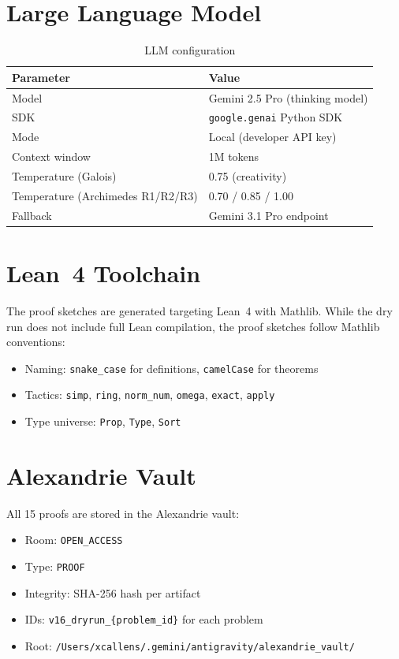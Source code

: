 \documentclass[12pt,a4paper]{report}
\theoremstyle{plain}
\theoremstyle{definition}
\theoremstyle{remark}
\begin{document}
\section{Large Language Model}

\begin{table}[h!]
\centering
\begin{tabular}{ll}
\toprule
\textbf{Parameter} & \textbf{Value} \\
\midrule
Model & Gemini 2.5 Pro (thinking model) \\
SDK & \texttt{google.genai} Python SDK \\
Mode & Local (developer API key) \\
Context window & 1M tokens \\
Temperature (Galois) & 0.75 (creativity) \\
Temperature (Archimedes R1/R2/R3) & 0.70 / 0.85 / 1.00 \\
Fallback & Gemini 3.1 Pro endpoint \\
\bottomrule
\end{tabular}
\caption{LLM configuration}
\end{table}

\section{Lean~4 Toolchain}

The proof sketches are generated targeting Lean~4 with Mathlib. While the dry run
does not include full Lean compilation, the proof sketches follow Mathlib conventions:
\begin{itemize}
  \item Naming: \texttt{snake\_case} for definitions, \texttt{camelCase} for theorems
  \item Tactics: \texttt{simp}, \texttt{ring}, \texttt{norm\_num}, \texttt{omega},
    \texttt{exact}, \texttt{apply}
  \item Type universe: \texttt{Prop}, \texttt{Type}, \texttt{Sort}
\end{itemize}

\section{Alexandrie Vault}

All 15 proofs are stored in the Alexandrie vault:
\begin{itemize}
  \item Room: \texttt{OPEN\_ACCESS}
  \item Type: \texttt{PROOF}
  \item Integrity: SHA-256 hash per artifact
  \item IDs: \texttt{v16\_dryrun\_\{problem\_id\}} for each problem
  \item Root: \texttt{/Users/xcallens/.gemini/antigravity/alexandrie\_vault/}
\end{itemize}
\end{document}
